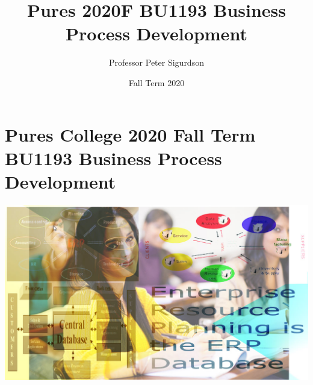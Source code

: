 \documentclass{article}
\title{Pures 2020F BU1193 Business Process Development}
\author{Professor Peter Sigurdson }
\date{Fall Term 2020}
\begin{document}
\maketitle

\section * {Pures College 2020 Fall Term BU1193 Business Process Development  }
\includegraphics[scale=0.6]{img/erp splash.jpg}

\end{document}
